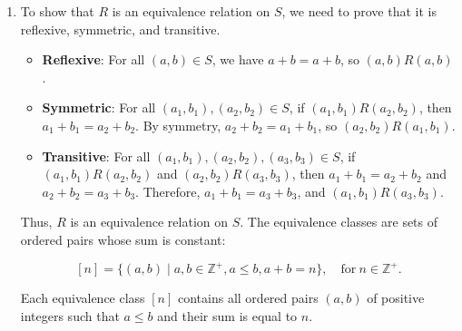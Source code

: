 \begin{enumerate}
\item
To show that $R$ is an equivalence relation on $S$, we need to prove that it is reflexive, symmetric, and transitive.

\begin{itemize}
\item \textbf{Reflexive}: For all $(a, b) \in S$, we have $a + b = a + b$, so $(a, b)R(a, b)$.
\item \textbf{Symmetric}: For all $(a_1, b_1), (a_2, b_2) \in S$, if $(a_1, b_1)R(a_2, b_2)$, then $a_1 + b_1 = a_2 + b_2$. By symmetry, $a_2 + b_2 = a_1 + b_1$, so $(a_2, b_2)R(a_1, b_1)$.
\item \textbf{Transitive}: For all $(a_1, b_1), (a_2, b_2), (a_3, b_3) \in S$, if $(a_1, b_1)R(a_2, b_2)$ and $(a_2, b_2)R(a_3, b_3)$, then $a_1 + b_1 = a_2 + b_2$ and $a_2 + b_2 = a_3 + b_3$. Therefore, $a_1 + b_1 = a_3 + b_3$, and $(a_1, b_1)R(a_3, b_3)$.
\end{itemize}

Thus, $R$ is an equivalence relation on $S$. The equivalence classes are sets of ordered pairs whose sum is constant:

$$
[n] = \{(a, b) \mid a, b \in \mathbb{Z}^+, a \leq b, a + b = n\}, \quad \text{for}\ n \in \mathbb{Z}^+.
$$

Each equivalence class $[n]$ contains all ordered pairs $(a, b)$ of positive integers such that $a \leq b$ and their sum is equal to $n$.
\end{enumerate}
